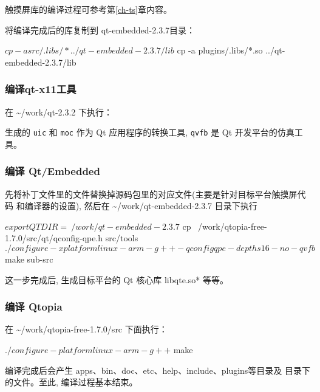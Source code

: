 触摸屏库的编译过程可参考第\ref{ch-ts}章内容。

将编译完成后的库复制到 qt-embedded-2.3.7目录：
\begin{blockcode}
$ cp -a src/.libs/* ../qt-embedded-2.3.7/lib
$ cp -a plugins/.libs/*.so ../qt-embedded-2.3.7/lib
\end{blockcode}

\subsubsection{编译qt-x11工具}
在 \textasciitilde/work/qt-2.3.2 下执行：

生成的 \verb|uic| 和 \verb|moc| 作为 Qt 应用程序的转换工具, \verb|qvfb|
是 Qt 开发平台的仿真工具。

\subsubsection{编译 Qt/Embedded}
先将补丁文件里的文件替换掉源码包里的对应文件(主要是针对目标平台触摸屏代码
和编译器的设置), 然后在 \textasciitilde/work/qt-embedded-2.3.7 目录下执行

\begin{blockcode} 
$ export QTDIR=~/work/qt-embedded-2.3.7
$ cp ~/work/qtopia-free-1.7.0/src/qt/qconfig-qpe.h src/tools
$ ./configure -xplatform linux-arm-g++ -qconfig qpe -depths 16 -no-qvfb
$ make sub-src
\end{blockcode}

这一步完成后, 生成目标平台的 Qt 核心库 libqte.so* 等等。

\subsubsection{编译 Qtopia}
在 \textasciitilde/work/qtopia-free-1.7.0/src 下面执行：
\begin{blockcode} 
$ ./configure -platform linux-arm-g++
$ make
\end{blockcode}

编译完成后会产生 apps、bin、doc、etc、help、include、plugins等目录及
目录下的文件。至此, 编译过程基本结束。

